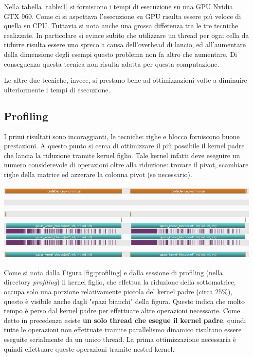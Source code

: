\documentclass{article}
\begin{document}
Nella tabella \ref{table:1} si forniscono i tempi di esecuzione su una GPU Nvidia GTX 960. Come ci si aspettava l'esecuzione su GPU risulta essere più veloce di quella su CPU. Tuttavia si nota anche una grossa differenza tra le tre tecniche realizzate. In particolare si evince subito che utilizzare un thread per ogni cella da ridurre risulta essere uno spreco a causa dell'overhead di lancio, ed all'aumentare della dimensione degli esempi questo problema non fa altro che aumentare. Di conseguenza questa tecnica non risulta adatta per questa computazione.

Le altre due tecniche, invece, si prestano bene ad ottimizzazioni volte a diminuire ulteriormente i tempi di esecuzione.

\subsection{Profiling}
I primi risultati sono incoraggianti, le tecniche: righe e blocco forniscono buone prestazioni. A questo punto si cerca di ottimizzare il più possibile il kernel padre che lancia la riduzione tramite kernel figlio. Tale kernel infatti deve eseguire un numero considerevole di operazioni oltre alla riduzione: trovare il pivot, scambiare righe della matrice ed azzerare la colonna pivot (se necessario). 
	\begin{center}
		\includegraphics[width = \textwidth]{profiling.png}
		\label{fig:profiling}
	\end{center}
	
Come si nota dalla Figura \ref{fig:profiling} e dalla sessione di profiling (nella directory \textit{profiling}) il kernel figlio, che effettua la riduzione della sottomatrice, occupa solo una porzione relativamente piccola del kernel padre (circa 25\%), questo è visibile anche dagli "spazi bianchi" della figura. Questo indica che molto tempo è perso dal kernel padre per effettuare altre operazioni necessarie. Come detto in precedenza esiste \textbf{un solo thread che esegue il kernel padre}, quindi tutte le operazioni non effettuate tramite parallelismo dinamico risultano essere eseguite serialmente da un unico thread. La prima ottimizzazione necessaria è quindi effettuare queste operazioni tramite nested kernel.
\end{document}
